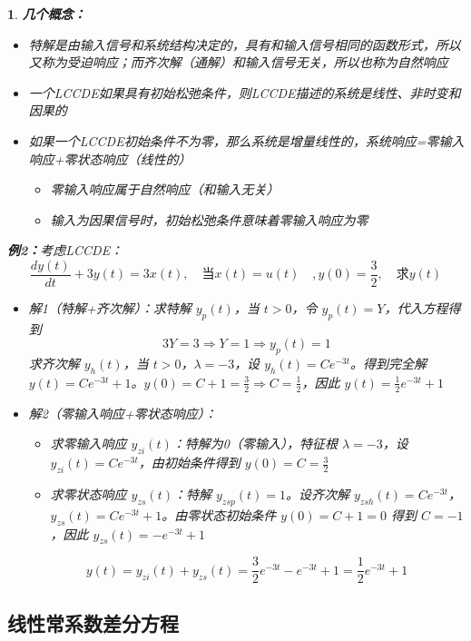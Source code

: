\documentclass[UTF8]{report}
\theoremstyle{MyLineTheoremStyle} %
\theoremstyle{MyBlockTheoremStyle} %
\theoremstyle{MySubsubsectionStyle} %
\newtheorem{definition}{}
\begin{document}
\begin{definition}
    \textbf{几个概念：}
    \begin{itemize}
        \item 特解是由输入信号和系统结构决定的，具有和输入信号相同的函数形式，所以又称为受迫响应；而齐次解（通解）和输入信号无关，所以也称为自然响应
        \item 一个LCCDE如果具有初始松弛条件，则LCCDE描述的系统是线性、非时变和因果的
        \item 如果一个LCCDE初始条件不为零，那么系统是增量线性的，系统响应=零输入响应+零状态响应（线性的）
        \begin{itemize}
            \item 零输入响应属于自然响应（和输入无关）
            \item 输入为因果信号时，初始松弛条件意味着零输入响应为零
        \end{itemize}
    \end{itemize}

    \textbf{例2：}考虑LCCDE：
    \[
    \frac{dy(t)}{dt} + 3y(t) = 3x(t), \quad \text{当} x(t) = u(t) \quad , y(0) = \frac{3}{2},\quad \text{求} y(t)
    \]
    \begin{itemize}
        \item 解1（特解+齐次解）：求特解 $y_p(t)$，当 $t > 0$，令 $y_p(t) = Y$，代入方程得到
        \[
        3Y = 3 \Rightarrow Y = 1 \Rightarrow y_p(t) = 1
        \]
        求齐次解 $y_h(t)$，当 $t > 0$，$\lambda = -3$，设 $y_h(t) = C e^{-3t}$。得到完全解 $y(t) = C e^{-3t} + 1$。$y(0) = C + 1 = \frac{3}{2} \Rightarrow C = \frac{1}{2}$，因此 $y(t) = \frac{1}{2} e^{-3t} + 1$
        \item 解2（零输入响应+零状态响应）：
        \begin{itemize}
            \item 求零输入响应 $y_{zi}(t)$：特解为0（零输入），特征根 $\lambda = -3$，设 $y_{zi}(t) = C e^{-3t}$，由初始条件得到 $y(0) = C = \frac{3}{2}$
            \item 求零状态响应 $y_{zs}(t)$：特解 $y_{zsp}(t) = 1$。设齐次解 $y_{zsh}(t) = C e^{-3t}$，$y_{zs}(t) = C e^{-3t} + 1$。由零状态初始条件 $y(0) = C + 1 = 0$ 得到 $C = -1$，因此 $y_{zs}(t) = -e^{-3t} + 1$
        \end{itemize}
        \[
        y(t) = y_{zi}(t) + y_{zs}(t) = \frac{3}{2} e^{-3t} - e^{-3t} + 1 = \frac{1}{2} e^{-3t} + 1
        \]
    \end{itemize}
\end{definition}


\subsection{\textbf{线性常系数差分方程}}
\end{document}
